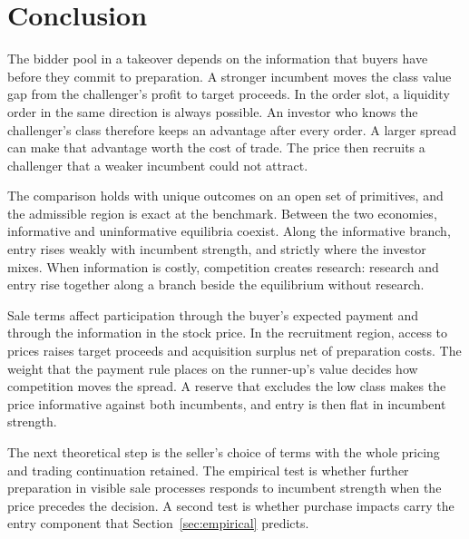 \section{Conclusion}\label{sec:conclusion}

The bidder pool in a takeover depends on the information that buyers have before they commit to preparation. A
stronger incumbent moves the class value gap from the challenger's profit to target proceeds. In the order slot, a
liquidity order in the same direction is always possible. An investor who knows the challenger's class therefore
keeps an advantage after every order. A larger spread can make that advantage worth the cost of trade. The price then
recruits a challenger that a weaker incumbent could not attract.

The comparison holds with unique outcomes on an open set of primitives, and the admissible region is exact at the
benchmark. Between the two economies, informative and uninformative equilibria coexist. Along the informative branch,
entry rises weakly with incumbent strength, and strictly where the investor mixes. When information is costly,
competition creates research: research and entry rise together along a branch beside the equilibrium without
research.

Sale terms affect participation through the buyer's expected payment and through the information in the stock price.
In the recruitment region, access to prices raises target proceeds and acquisition surplus net of preparation costs.
The weight that the payment rule places on the runner-up's value decides how competition moves the spread. A reserve
that excludes the low class makes the price informative against both incumbents, and entry is then flat in incumbent
strength.

The next theoretical step is the seller's choice of terms with the whole pricing and trading continuation retained.
The empirical test is whether further preparation in visible sale processes responds to incumbent strength when the
price precedes the decision. A second test is whether purchase impacts carry the entry component that
Section~\ref{sec:empirical} predicts.
